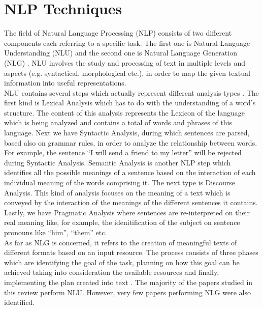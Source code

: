 \section{NLP Techniques}
The field of Natural Language Processing (NLP) consists of two different components each referring to a specific task. The first one is Natural Language Understanding (NLU) and the second one is Natural Language 
Generation (NLG) \cite{liddy2001natural, khurana2017natural}. NLU involves the study and processing of text in multiple levels and aspects (e.g. syntactical, morphological etc.), in order to map the given textual 
information into useful representations. \\
NLU contains several steps which actually represent different analysis types \cite{liddy2001natural}. The first kind is Lexical Analysis which has to do with the understanding of a word's structure. 
The content of this analysis represents the Lexicon of the language which is being analyzed and contains a total of words and phrases of this language. Next we have Syntactic Analysis, during which sentences are parsed, 
based also on grammar rules, in order to analyze the relationship between words. For example, the sentence ``I will send a friend to my letter'' will be rejected during Syntactic Analysis. Semantic Analysis is another NLP 
step which identifies all the possible meanings of a sentence based on the interaction of each individual meaning of the words comprising it. The next type is Discourse Analysis. This kind of analysis focuses on the 
meaning of a text which is conveyed by the interaction of the meanings of the different sentences it contains. Lastly, we have Pragmatic Analysis where sentences are re-interpreted on their real meaning like, for 
example, the idenitification of the subject on sentence pronouns like ``him'', ``them'' etc.\\ As far as NLG is concerned, it refers to the creation of meaningful texts of different formats based on an input resource. 
The process consists of three phases which are identifying the goal of the task, planning on how this goal can be achieved taking into consideration the available resources and finally, implementing the plan 
created into text \cite{khurana2017natural}. The majority of the papers studied in this review perform NLU. However, very few papers performing NLG were also identified.

